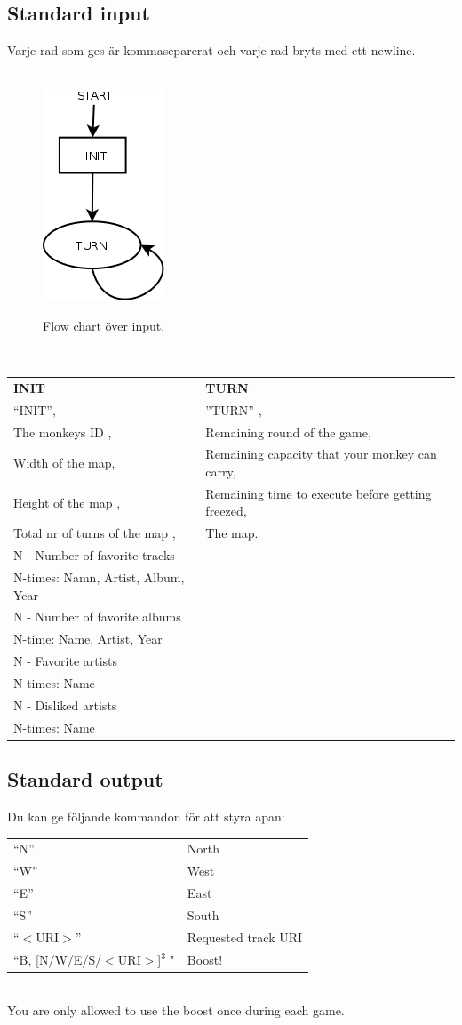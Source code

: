 \documentclass[a4paper, 10pt]{article}
\begin{document}
\subsection*{Standard input}
Varje rad som ges är kommaseparerat och varje rad bryts med ett newline.\\\\
\begin{figure}[h!]
\centering
\includegraphics[scale=0.2]{stdinflow} \\
\caption{Flow chart över input. }
\end{figure} \\
\begin{tabular}{l l}
\textbf{INIT}				 & \textbf{TURN} \\
“INIT”,				 & ”TURN” , \\
The monkeys ID , 	 & Remaining round of the game,	\\
Width of the map,  & Remaining capacity that your monkey can carry,\\
Height of the map , & Remaining time to execute before getting freezed,  \\
Total nr of turns of the map , & The map. \\ 
N - Number of favorite tracks  \\
N-times: Namn, Artist, Album, Year  \\
N - Number of favorite albums \\
N-time: Name, Artist, Year \\
N - Favorite artists \\
N-times: Name\\
N - Disliked artists \\
N-times: Name \\
\end{tabular}
\subsection*{Standard output}
Du kan ge följande kommandon för att styra apan: \\
\begin{tabular}{l l}
“N” & North \\
“W” & West \\
“E” & East \\
“S” & South \\
“$<$URI$>$” & Requested track URI \\
“B, [N/W/E/S/$<$URI$>$]$^3$ " &Boost!	  \\
\end{tabular} \\
You are only allowed to use the boost once during each game. 
\newpage
\end{document}
